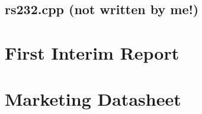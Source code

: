 \documentclass[a4paper,10pt]{article}  %
\begin{document}


\subsection[rs232.cpp]{rs232.cpp (not written by me!)}



\FloatBarrier

\section{First Interim Report}
\label{sec:first-interim-report}

\section{Marketing Datasheet}
\label{sec:marketing-datasheet}



\end{document}
